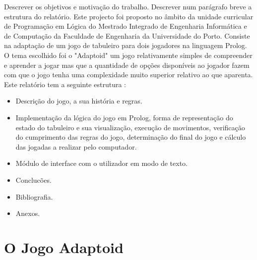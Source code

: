 \documentclass[a4paper]{article}
\begin{document}
Descrever os objetivos e motivação do trabalho. Descrever num parágrafo breve a estrutura do relatório.
Este projecto foi proposto no âmbito da unidade curricular de Programação em Lógica do Mestrado Integrado de Engenharia Informática e de Computação da Faculdade de Engenharia da Universidade do Porto. Consiste na adaptação de um jogo de tabuleiro para dois jogadores na linguagem Prolog. O tema escolhido foi o "Adaptoid" um jogo relativamente simples de compreender e aprender a jogar mas que a quantidade de opções disponíveis ao jogador fazem com que o jogo tenha uma complexidade muito superior relativo ao que aparenta.
Este relatório tem a seguinte estrutura :
 \begin{itemize}
   \item Descrição do jogo, a sua história e regras.
   \item Implementação da lógica do jogo em Prolog, forma de representação do estado do tabuleiro e sua visualização, execução de movimentos, verificação do cumprimento das regras do jogo, determinação do final do jogo e cálculo das jogadas a realizar pelo computador.
   \item Módulo de interface com o utilizador em modo de texto.
   \item Conclucões.
   \item Bibliografia.
   \item Anexos.
 \end{itemize}



\section{O Jogo Adaptoid}
\end{document}
